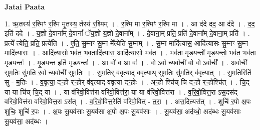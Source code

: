 \documentclass[17pt]{extarticle}
\begin{document}
\textbf{Jatai Paata} \newline

1. ऋ॒तस्य॑ र॒श्मिꣳ र॒श्मि मृ॒तस्य॒ र्तस्य॑ र॒श्मिम् । . र॒श्मि मा र॒श्मिꣳ र॒श्मि मा । . आ द॑दे दद॒ आ द॑दे । . द॒द॒ इति॑ ददे । . य॒ज्ञो दे॒वाना᳚म् दे॒वानां᳚ ॅय॒ज्ञो य॒ज्ञो दे॒वाना᳚म् । . दे॒वाना॒म् प्रति॒ प्रति॑ दे॒वाना᳚म् दे॒वाना॒म् प्रति॑ । . प्रत्ये᳚ त्येति॒ प्रति॒ प्रत्ये॑ति । . ए॒ति॒ सु॒म्नꣳ सु॒म्न मे᳚त्येति सु॒म्नम् । . सु॒म्न मादि॑त्यास॒ आदि॑त्यासः सु॒म्नꣳ सु॒म्न मादि॑त्यासः । . आदि॑त्यासो॒ भव॑त॒ भव॒तादि॑त्यास॒ आदि॑त्यासो॒ भव॑त । . भव॑ता मृड॒यन्तो॑ मृड॒यन्तो॒ भव॑त॒ भव॑ता मृड॒यन्तः॑ । . मृ॒ड॒यन्त॒ इति॑ मृड॒यन्तः॑ । . आ वो॑ व॒ आ वः॑ । . वो॒ ऽर्वा च्य॒र्वाची॑ वो वो॒ ऽर्वाची᳚ । . अ॒र्वाची॑ सुम॒तिः सु॑म॒ति र॒र्वा च्य॒र्वाची॑ सुम॒तिः । . सु॒म॒तिर् व॑वृत्याद् ववृत्याथ् सुम॒तिः सु॑म॒तिर् व॑वृत्यात् । . सु॒म॒तिरिति॑ सु - म॒तिः । . व॒वृ॒त्या॒ दꣳ॒॒हो रꣳ॒॒होर् व॑वृत्याद् ववृत्या दꣳ॒॒होः । . अꣳ॒॒हो श्चि॑च् चि दꣳ॒॒हो रꣳ॒॒होश्चि॑त् । . चि॒द् या या चि॑च् चि॒द् या । . या व॑रिवो॒वित्त॑रा वरिवो॒वित्त॑रा॒ या या व॑रिवो॒वित्त॑रा । . व॒रि॒वो॒वित्त॒रा ऽस॒दस॑द् वरिवो॒वित्त॑रा वरिवो॒वित्त॒रा ऽस॑त् । . व॒रि॒वो॒वित्त॒रेति॑ वरिवो॒वित् - त॒रा॒ । . अस॒दित्यस॑त् । . शुचि॑ र॒पो अ॒पः शुचिः॒ शुचि॑ र॒पः । . अ॒पः सू॒यव॑साः सू॒यव॑सा अ॒पो अ॒पः सू॒यव॑साः । . सू॒यव॑सा॒ अद॑ब्धो॒ अद॑ब्धः सू॒यव॑साः सू॒यव॑सा॒ अद॑ब्धः । \newline
\end{document}
